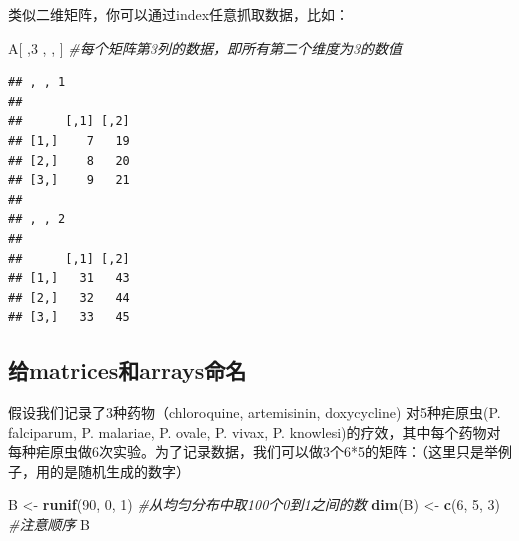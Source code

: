\documentclass[]{book}
\newenvironment{Shaded}{\begin{snugshade}}{\end{snugshade}}
\newcommand{\CommentTok}[1]{\textcolor[rgb]{0.56,0.35,0.01}{\textit{#1}}}
\newcommand{\DecValTok}[1]{\textcolor[rgb]{0.00,0.00,0.81}{#1}}
\newcommand{\KeywordTok}[1]{\textcolor[rgb]{0.13,0.29,0.53}{\textbf{#1}}}
\newcommand{\NormalTok}[1]{#1}
\newcommand{\StringTok}[1]{\textcolor[rgb]{0.31,0.60,0.02}{#1}}
\begin{document}
类似二维矩阵，你可以通过index任意抓取数据，比如：

\begin{Shaded}
\begin{Highlighting}[]
\NormalTok{A[ ,}\DecValTok{3}\NormalTok{ , , ] }\CommentTok{#每个矩阵第3列的数据，即所有第二个维度为3的数值}
\end{Highlighting}
\end{Shaded}

\begin{verbatim}
## , , 1
## 
##      [,1] [,2]
## [1,]    7   19
## [2,]    8   20
## [3,]    9   21
## 
## , , 2
## 
##      [,1] [,2]
## [1,]   31   43
## [2,]   32   44
## [3,]   33   45
\end{verbatim}

\hypertarget{matricesarrays}{%
\subsection{给matrices和arrays命名}\label{matricesarrays}}

假设我们记录了3种药物（chloroquine, artemisinin, doxycycline)
对5种疟原虫(P. falciparum, P. malariae, P. ovale, P. vivax, P. knowlesi)的疗效，其中每个药物对每种疟原虫做6次实验。为了记录数据，我们可以做3个6*5的矩阵：（这里只是举例子，用的是随机生成的数字）

\begin{Shaded}
\begin{Highlighting}[]
\NormalTok{B <-}\StringTok{ }\KeywordTok{runif}\NormalTok{(}\DecValTok{90}\NormalTok{, }\DecValTok{0}\NormalTok{, }\DecValTok{1}\NormalTok{) }\CommentTok{#从均匀分布中取100个0到1之间的数}
\KeywordTok{dim}\NormalTok{(B) <-}\StringTok{ }\KeywordTok{c}\NormalTok{(}\DecValTok{6}\NormalTok{, }\DecValTok{5}\NormalTok{, }\DecValTok{3}\NormalTok{) }\CommentTok{#注意顺序}
\NormalTok{B}
\end{Highlighting}
\end{Shaded}
\end{document}
